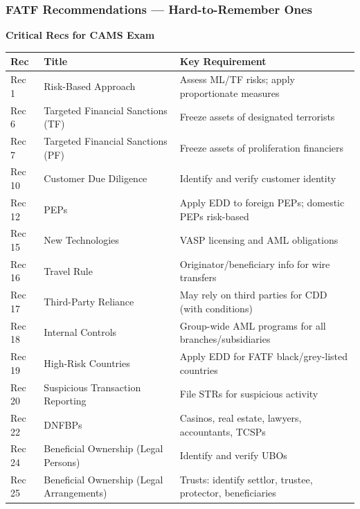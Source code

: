 \documentclass[12pt,aspectratio=169]{beamer}
\renewcommand{\scriptsize}{\fontsize{4.5}{5.5}\selectfont}
\newcommand{\keypoint}[1]{\textcolor{deepblue}{\textbf{#1}}}
\begin{document}
	\begin{frame}
		\frametitle{\fontsize{11}{13}\selectfont \textbf{FATF Recommendations — Hard-to-Remember Ones}}
		\begin{block}{\fontsize{7}{9}\selectfont \textbf{Critical Recs for CAMS Exam}}
			\scriptsize
			\begin{longtable}{|p{}|p{}|p{}|}
				\hline
				\keypoint{Rec} & \keypoint{Title} & \keypoint{Key Requirement} \\
				\hline
				Rec 1 & Risk-Based Approach & Assess ML/TF risks; apply proportionate measures \\
				\hline
				Rec 6 & Targeted Financial Sanctions (TF) & Freeze assets of designated terrorists \\
				\hline
				Rec 7 & Targeted Financial Sanctions (PF) & Freeze assets of proliferation financiers \\
				\hline
				Rec 10 & Customer Due Diligence & Identify and verify customer identity \\
				\hline
				Rec 12 & PEPs & Apply EDD to foreign PEPs; domestic PEPs risk-based \\
				\hline
				Rec 15 & New Technologies & VASP licensing and AML obligations \\
				\hline
				Rec 16 & Travel Rule & Originator/beneficiary info for wire transfers \\
				\hline
				Rec 17 & Third-Party Reliance & May rely on third parties for CDD (with conditions) \\
				\hline
				Rec 18 & Internal Controls & Group-wide AML programs for all branches/subsidiaries \\
				\hline
				Rec 19 & High-Risk Countries & Apply EDD for FATF black/grey-listed countries \\
				\hline
				Rec 20 & Suspicious Transaction Reporting & File STRs for suspicious activity \\
				\hline
				Rec 22 & DNFBPs & Casinos, real estate, lawyers, accountants, TCSPs \\
				\hline
				Rec 24 & Beneficial Ownership (Legal Persons) & Identify and verify UBOs \\
				\hline
				Rec 25 & Beneficial Ownership (Legal Arrangements) & Trusts: identify settlor, trustee, protector, beneficiaries \\

\end{longtable}
\end{block}
\end{frame}
\end{document}
